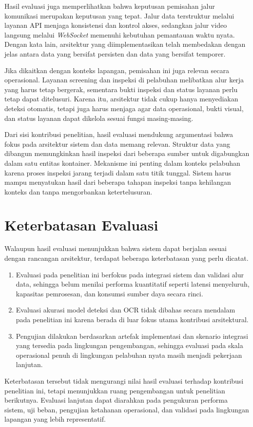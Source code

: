 Hasil evaluasi juga memperlihatkan bahwa keputusan pemisahan jalur komunikasi
merupakan keputusan yang tepat. Jalur data terstruktur melalui layanan API
menjaga konsistensi dan kontrol akses, sedangkan jalur video langsung melalui
\textit{WebSocket} memenuhi kebutuhan pemantauan waktu nyata. Dengan kata lain,
arsitektur yang diimplementasikan telah membedakan dengan jelas antara data yang
bersifat persisten dan data yang bersifat temporer.

Jika dikaitkan dengan konteks lapangan, pemisahan ini juga relevan secara
operasional. Layanan screening dan inspeksi di pelabuhan melibatkan alur kerja
yang harus tetap bergerak, sementara bukti inspeksi dan status layanan perlu
tetap dapat ditelusuri. Karena itu, arsitektur tidak cukup hanya menyediakan
deteksi otomatis, tetapi juga harus menjaga agar data operasional, bukti
visual, dan status layanan dapat dikelola sesuai fungsi masing-masing.

Dari sisi kontribusi penelitian, hasil evaluasi mendukung argumentasi bahwa
fokus pada arsitektur sistem dan data memang relevan. Struktur data yang
dibangun memungkinkan hasil inspeksi dari beberapa sumber untuk digabungkan
dalam satu entitas kontainer. Mekanisme ini penting dalam konteks pelabuhan
karena proses inspeksi jarang terjadi dalam satu titik tunggal. Sistem harus
mampu menyatukan hasil dari beberapa tahapan inspeksi tanpa kehilangan konteks
dan tanpa mengorbankan ketertelusuran.

\section{Keterbatasan Evaluasi}
\label{sec:keterbatasan-evaluasi}

Walaupun hasil evaluasi menunjukkan bahwa sistem dapat berjalan sesuai dengan
rancangan arsitektur, terdapat beberapa keterbatasan yang perlu dicatat.

\begin{enumerate}
    \item Evaluasi pada penelitian ini berfokus pada integrasi sistem dan
    validasi alur data, sehingga belum menilai performa kuantitatif seperti
    latensi menyeluruh, kapasitas pemrosesan, dan konsumsi sumber daya secara rinci.
    \item Evaluasi akurasi model deteksi dan OCR tidak dibahas secara mendalam
    pada penelitian ini karena berada di luar fokus utama kontribusi
    arsitektural.
    \item Pengujian dilakukan berdasarkan artefak implementasi dan skenario
    integrasi yang tersedia pada lingkungan pengembangan, sehingga evaluasi
    pada skala operasional penuh di lingkungan pelabuhan nyata masih menjadi
    pekerjaan lanjutan.
\end{enumerate}

Keterbatasan tersebut tidak mengurangi nilai hasil evaluasi terhadap kontribusi
penelitian ini, tetapi menunjukkan ruang pengembangan untuk penelitian
berikutnya. Evaluasi lanjutan dapat diarahkan pada pengukuran performa sistem,
uji beban, pengujian ketahanan operasional, dan validasi pada lingkungan
lapangan yang lebih representatif.
